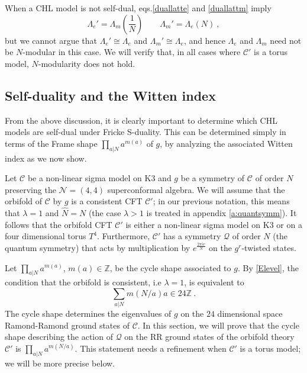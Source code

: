 \documentclass[a4paper,11pt]{article}
\newcommand{\ZZ}{\mathbb{Z}}
\newcommand{\C}{\mathcal{C}}
\newcommand{\N}{\mathcal{N}}
\newcommand{\Q}{\mathcal{Q}}
\numberwithin{equation}{section}
\def\be{\begin{equation}}
\def\ee{\end{equation}}
\begin{document}
When a CHL model is not self-dual,  eqs.\eqref{duallatte} and \eqref{duallattm} 
imply
\be \Lambda_e'= \Lambda_m(\frac{1}{N})\qquad \Lambda_m'= \Lambda_e(N)\ ,
\ee but we cannot argue that $\Lambda_e'\cong \Lambda_e$ and $\Lambda_m'\cong \Lambda_e$, and hence $\Lambda_e$ and $\Lambda_m$ need not be $N$-modular in this case. We will verify that, in all cases where $\C'$ is a torus model, $N$-modularity does not hold. 



\subsection{Self-duality and the Witten index}
\label{s:quantsymm}



From the above discussion, it is clearly important to determine which CHL models are self-dual under Fricke S-duality. This can be determined simply in terms of the Frame shape $\prod_{a|N} a^{m(a)}$ of $g$, by analyzing the associated Witten index as we now show. 


Let $\C$ be a non-linear sigma model on K3 and $g$ be a symmetry of $\C$  of order $N$ preserving the $\N=(4,4)$ superconformal algebra. We will assume that the orbifold of $\C$ by $g$ is a consistent CFT $\C'$; in our previous notation, this means that $\lambda=1$ and $\hat N=N$ (the case $\lambda>1$ is treated in appendix \ref{a:quantsymm}). It follows that the orbifold CFT $\C'$ is either a non-linear sigma model on K3 or on a four dimensional torus $T^4$. Furthermore, $\C'$ has a symmetry $\Q$ of order $N$ (the quantum symmetry) that acts by multiplication by $e^{\frac{2\pi i r}{N}}$ on the $g^r$-twisted states.  

Let $\prod_{a|N} a^{m(a)}$, $m(a)\in \ZZ$, be the cycle shape associated to $g$. By \eqref{Elevel}, the condition that the orbifold is consistent, i.e $\lambda=1$, is equivalent to
\be\label{consorbif} \sum_{a|N}m(N/a)a\in 24\ZZ\ .\ee The cycle shape determines the eigenvalues of $g$ on the $24$ dimensional space Ramond-Ramond ground states of $\C$. In this section, we will prove that the cycle shape describing the action of $\Q$ on the RR ground states of the orbifold theory $\C'$ is $\prod_{a|N} a^{m(N/a)}$. This statement needs a refinement when $\C'$ is a torus model; we will be more precise below.
\end{document}
